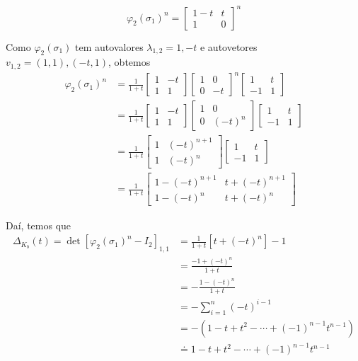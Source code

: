 \documentclass[a4paper,portuguese,11pt,twoside, leqno]{book}
\theoremstyle{definition}
\begin{document}
	\begin{equation*}
	\varphi_2(\sigma_1)^n = \begin{bmatrix}
	1-t & t \\
	1 & 0
	\end{bmatrix}^n
	\end{equation*}
	\par\vspace{0.3cm} Como $\varphi_2(\sigma_1)$ tem autovalores $\lambda_{1,2} = 1, -t$ e autovetores $v_{1,2} = (1,1), (-t,1)$, obtemos
	\begin{align*}
	\varphi_2(\sigma_1)^n &= \frac{1}{1+t}\begin{bmatrix}
	1 & -t \\
	1 & 1
	\end{bmatrix}\begin{bmatrix}
	1 & 0 \\
	0 & -t
	\end{bmatrix}^n\begin{bmatrix}
	1 & t \\
	-1 & 1
	\end{bmatrix} \\
	&= \frac{1}{1+t}\begin{bmatrix}
	1 & -t \\
	1 & 1
	\end{bmatrix}\begin{bmatrix}
	1 & 0 \\
	0 & (-t)^n
	\end{bmatrix}\begin{bmatrix}
	1 & t \\
	-1 & 1
	\end{bmatrix} \\
	&= \frac{1}{1+t}\begin{bmatrix}
	1 & (-t)^{n+1} \\
	1 & (-t)^n
	\end{bmatrix}\begin{bmatrix}
	1 & t \\
	-1 & 1
	\end{bmatrix} \\
	&= \frac{1}{1+t}\begin{bmatrix}
	1 - (-t)^{n+1} & t + (-t)^{n+1} \\
	1 - (-t)^n & t + (-t)^n
	\end{bmatrix}
	\end{align*}
	\par\vspace{0.3cm} Daí, temos que
	\begin{align*}
	\Delta_{K_b}(t) = \det[\varphi_2(\sigma_1)^n - I_2]_{1,1} &= \frac{1}{1+t}[t+(-t)^n] - 1 \\
	&= \frac{-1 + (-t)^n}{1+t} \\
	&= -\frac{1 - (-t)^n}{1+t} \\
	&= -\sum_{i=1}^{n}(-t)^{i-1} \\
	&= -(1-t+t^2-\cdots+(-1)^{n-1}t^{n-1}) \\
	&\doteq 1-t+t^2-\cdots+(-1)^{n-1}t^{n-1} 
	\end{align*}
\end{document}
